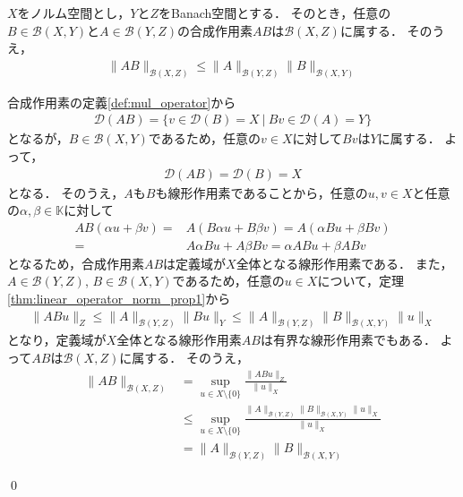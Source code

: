\begin{Thm}\label{thm:linear_operator_norm_prop2}
$X$をノルム空間とし，$Y$と$Z$をBanach空間とする．
そのとき，任意の$B \in {\mathcal B}(X, Y)$と$A \in {\mathcal B}(Y, Z)$の合成作用素$AB$は${\mathcal B}(X, Z)$に属する．
そのうえ，
\begin{align*}
\| A B \|_{{\mathcal B}(X, Z)} \le \| A \|_{{\mathcal B}(Y, Z)} \| B \|_{{\mathcal B}(X,Y)}
\end{align*}
\end{Thm}

\begin{Proof}
合成作用素の定義\ref{def:mul_operator}から
\begin{align*}
{\mathcal D}(AB) = \{ v \in {\mathcal D}(B) = X ~ | ~ Bv \in {\mathcal D}(A) = Y \}
\end{align*}
となるが，$B \in {\mathcal B}(X, Y)$であるため，任意の$v \in X$に対して$B v$は$Y$に属する．
よって，
\begin{align*}
{\mathcal D}(AB) = {\mathcal D}(B) = X
\end{align*}
となる．
そのうえ，$A$も$B$も線形作用素であることから，任意の$u, v \in X$と任意の$\alpha, \beta \in {\mathbb K}$に対して
\begin{align*}
AB ( \alpha u + \beta v ) =& A ( B \alpha u + B \beta v ) = A ( \alpha B u + \beta B v ) \\
=& A \alpha B u + A \beta B v = \alpha A B u + \beta A B v
\end{align*}
となるため，合成作用素$AB$は定義域が$X$全体となる線形作用素である．
また，$A \in {\mathcal B}(Y, Z)$, $B \in {\mathcal B}(X, Y)$であるため，任意の$u \in X$について，定理\ref{thm:linear_operator_norm_prop1}から
\begin{align*}
 \| A B u \|_{Z} \le \| A \|_{{\mathcal B}(Y, Z)} \| B u \|_{Y} \le  \| A \|_{{\mathcal B}(Y, Z)} \| B \|_{{\mathcal B}(X, Y)} \| u \|_{X}
\end{align*}
となり，定義域が$X$全体となる線形作用素$AB$は有界な線形作用素でもある．
よって$AB$は${\mathcal B}(X, Z)$に属する．
そのうえ，
\begin{align*}
\| A B \|_{{\mathcal B}(X, Z)} &= \sup_{ u \in X \setminus \{ 0 \}} \frac{ \| A B u \|_{Z} }{ \| u \|_{X} } \\
&\le \sup_{ u \in X \setminus \{ 0 \}} \frac{ \| A \|_{{\mathcal B}(Y, Z)} \| B \|_{{\mathcal B}(X, Y)} \| u \|_{X} }{ \| u \|_{X} } \\
&= \| A \|_{{\mathcal B}(Y, Z)} \| B \|_{{\mathcal B}(X, Y)}
\end{align*}

\qed
\end{Proof}

